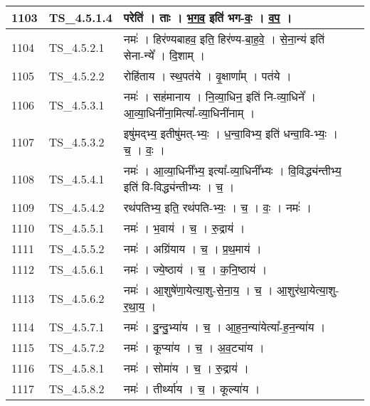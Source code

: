 \documentclass[17pt]{extarticle}
\begin{document}
\begin{longtable}{||p{0.4in}||p{0.9in}||p{4.0in}||p{0.9in}||}
        \hline
            1103 & TS\_4.5.1.4 & परेति॑   ।   ताः   ।   भ॒ग॒व॒ इति॑ भग{-}वः॒   ।   व॒प॒   ।    &      \\
        \hline
            1104 & TS\_4.5.2.1 & नमः॑   ।   हिर॑ण्यबाहव॒ इति॒ हिर॑ण्य{-}बा॒ह॒वे॒   ।   से॒ना॒न्य॑ इति॑ सेना{-}न्ये᳚   ।   दि॒शाम्   ।    &      \\
        \hline
            1105 & TS\_4.5.2.2 & रोहि॑ताय   ।   स्थ॒पत॑ये   ।   वृ॒क्षाणा᳚म्   ।   पत॑ये   ।    &      \\
        \hline
            1106 & TS\_4.5.3.1 & नमः॑   ।   सह॑मानाय   ।   नि॒व्या॒धिन॒ इति॑ नि{-}व्या॒धिने᳚   ।   आ॒व्या॒धिनी॑ना॒मित्या᳚{-}व्या॒धिनी॑नाम्   ।    &      \\
        \hline
            1107 & TS\_4.5.3.2 & इषु॑मद्भ्य॒ इतीषु॑मत्{-}भ्यः॒   ।   ध॒न्वा॒विभ्य॒ इति॑ धन्वा॒वि{-}भ्यः॒   ।   च॒   ।   वः॒   ।    &      \\
        \hline
            1108 & TS\_4.5.4.1 & नमः॑   ।   आ॒व्या॒धिनी᳚भ्य॒ इत्या᳚{-}व्या॒धिनी᳚भ्यः   ।   वि॒विद्ध्य॑न्तीभ्य॒ इति॑ वि{-}विद्ध्य॑न्तीभ्यः   ।   च॒   ।    &      \\
        \hline
            1109 & TS\_4.5.4.2 & रथ॑पतिभ्य॒ इति॒ रथ॑पति{-}भ्यः॒   ।   च॒   ।   वः॒   ।   नमः॑   ।    &      \\
        \hline
            1110 & TS\_4.5.5.1 & नमः॑   ।   भ॒वाय॑   ।   च॒   ।   रु॒द्राय॑   ।    &      \\
        \hline
            1111 & TS\_4.5.5.2 & नमः॑   ।   अग्रि॑याय   ।   च॒   ।   प्र॒थ॒माय॑   ।    &      \\
        \hline
            1112 & TS\_4.5.6.1 & नमः॑   ।   ज्ये॒ष्ठाय॑   ।   च॒   ।   क॒नि॒ष्ठाय॑   ।    &      \\
        \hline
            1113 & TS\_4.5.6.2 & नमः॑   ।   आ॒शुषे॑णा॒येत्या॒शु{-}से॒ना॒य॒   ।   च॒   ।   आ॒शुर॑था॒येत्या॒शु{-}र॒था॒य॒   ।    &      \\
        \hline
            1114 & TS\_4.5.7.1 & नमः॑   ।   दु॒न्दु॒भ्या॑य   ।   च॒   ।   आ॒ह॒न॒न्या॑येत्या᳚{-}ह॒न॒न्या॑य   ।    &      \\
        \hline
            1115 & TS\_4.5.7.2 & नमः॑   ।   कूप्या॑य   ।   च॒   ।   अ॒व॒ट्या॑य   ।    &      \\
        \hline
            1116 & TS\_4.5.8.1 & नमः॑   ।   सोमा॑य   ।   च॒   ।   रु॒द्राय॑   ।    &      \\
        \hline
            1117 & TS\_4.5.8.2 & नमः॑   ।   तीर्थ्या॑य   ।   च॒   ।   कूल्या॑य   ।    &      \\
        \hline

\end{longtable}
\end{document}
